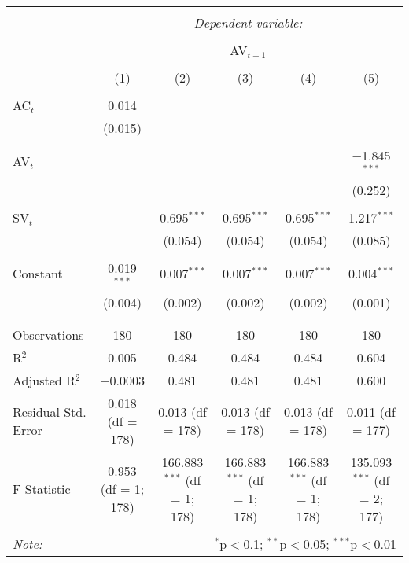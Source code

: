 
\begin{table}[!htbp] \centering 
  \caption{} 
  \label{} 
\begin{tabular}{@{\extracolsep{5pt}}lccccc} 
\\[-1.8ex]\hline 
\hline \\[-1.8ex] 
 & \multicolumn{5}{c}{\textit{Dependent variable:}} \\ 
\cline{2-6} 
\\[-1.8ex] & \multicolumn{5}{c}{AV$_{t+1}$} \\ 
\\[-1.8ex] & (1) & (2) & (3) & (4) & (5)\\ 
\hline \\[-1.8ex] 
 AC$_{t}$ & 0.014 &  &  &  &  \\ 
  & (0.015) &  &  &  &  \\ 
  & & & & & \\ 
 AV$_{t}$ &  &  &  &  & $-$1.845$^{***}$ \\ 
  &  &  &  &  & (0.252) \\ 
  & & & & & \\ 
 SV$_{t}$ &  & 0.695$^{***}$ & 0.695$^{***}$ & 0.695$^{***}$ & 1.217$^{***}$ \\ 
  &  & (0.054) & (0.054) & (0.054) & (0.085) \\ 
  & & & & & \\ 
 Constant & 0.019$^{***}$ & 0.007$^{***}$ & 0.007$^{***}$ & 0.007$^{***}$ & 0.004$^{***}$ \\ 
  & (0.004) & (0.002) & (0.002) & (0.002) & (0.001) \\ 
  & & & & & \\ 
\hline \\[-1.8ex] 
Observations & 180 & 180 & 180 & 180 & 180 \\ 
R$^{2}$ & 0.005 & 0.484 & 0.484 & 0.484 & 0.604 \\ 
Adjusted R$^{2}$ & $-$0.0003 & 0.481 & 0.481 & 0.481 & 0.600 \\ 
Residual Std. Error & 0.018 (df = 178) & 0.013 (df = 178) & 0.013 (df = 178) & 0.013 (df = 178) & 0.011 (df = 177) \\ 
F Statistic & 0.953 (df = 1; 178) & 166.883$^{***}$ (df = 1; 178) & 166.883$^{***}$ (df = 1; 178) & 166.883$^{***}$ (df = 1; 178) & 135.093$^{***}$ (df = 2; 177) \\ 
\hline 
\hline \\[-1.8ex] 
\textit{Note:}  & \multicolumn{5}{r}{$^{*}$p$<$0.1; $^{**}$p$<$0.05; $^{***}$p$<$0.01} \\ 
\end{tabular} 
\end{table} 
